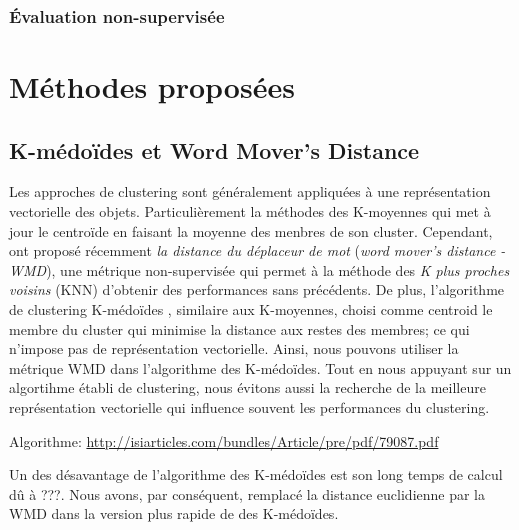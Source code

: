 \subsubsection{Évaluation non-supervisée}

\section{Méthodes proposées}

\subsection{K-médoïdes et \og Word Mover's Distance \fg}

Les approches de clustering sont généralement appliquées à une représentation vectorielle des objets. Particulièrement la méthodes des K-moyennes qui met à jour le centroïde en faisant la moyenne des menbres de son cluster. Cependant, \cite{kusner2015wordmoverdist} ont proposé récemment \textit{la distance du déplaceur de mot} (\textit{word mover's distance - WMD}), une métrique non-supervisée qui permet à la méthode des \textit{K plus proches voisins} (KNN) d'obtenir des performances sans précédents. De plus, l'algorithme de clustering K-médoïdes \citep{kaufman1987kmedoids}, similaire aux K-moyennes, choisi comme centroid le membre du cluster qui minimise la distance aux restes des membres; ce qui n'impose pas de représentation vectorielle. Ainsi, nous pouvons utiliser la métrique WMD dans  l'algorithme des K-médoïdes. Tout en nous appuyant sur un algortihme établi de clustering, nous évitons aussi la recherche de la meilleure représentation vectorielle qui influence souvent les performances du clustering. 

Algorithme: \url{http://isiarticles.com/bundles/Article/pre/pdf/79087.pdf}


Un des désavantage de l'algorithme des K-médoïdes est son long temps de calcul dû à ???. Nous avons, par conséquent, remplacé la distance euclidienne par la WMD dans la version plus rapide de \cite{Park2009fastkmedoids} des K-médoïdes.


